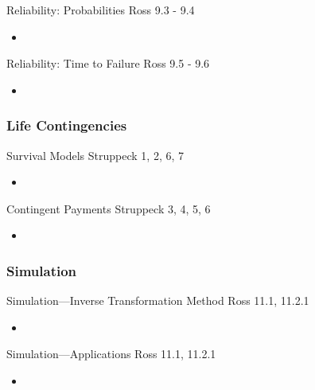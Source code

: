 \documentclass[12pt, titlepage, french]{report}
\begin{document}
\begin{CHPT_SUMM_AUTO_NUMB}[label = {L.-18}]{Reliability: Probabilities}
Ross 9.3 - 9.4
	\begin{itemize}
		\item	
	\end{itemize}
\end{CHPT_SUMM_AUTO_NUMB}

\begin{CHPT_SUMM_AUTO_NUMB}[label = {L.-19}]{Reliability: Time to Failure}
Ross 9.5 - 9.6
	\begin{itemize}
		\item	
	\end{itemize}
\end{CHPT_SUMM_AUTO_NUMB}

\subsubsection*{Life Contingencies}

\begin{CHPT_SUMM_AUTO_NUMB}[label = {L.-20}]{Survival Models}
Struppeck 1, 2, 6, 7
	\begin{itemize}
		\item	
	\end{itemize}
\end{CHPT_SUMM_AUTO_NUMB}

\begin{CHPT_SUMM_AUTO_NUMB}[label = {L.-21}]{Contingent Payments}
Struppeck 3, 4, 5, 6
	\begin{itemize}
		\item	
	\end{itemize}
\end{CHPT_SUMM_AUTO_NUMB}

\subsubsection*{Simulation}

\begin{CHPT_SUMM_AUTO_NUMB}[label = {L.-22}]{Simulation---Inverse Transformation Method}
Ross 11.1, 11.2.1
	\begin{itemize}
		\item	
	\end{itemize}
\end{CHPT_SUMM_AUTO_NUMB}

\begin{CHPT_SUMM_AUTO_NUMB}[label = {L.-23}]{Simulation---Applications}
Ross 11.1, 11.2.1
	\begin{itemize}
		\item	
	\end{itemize}
\end{CHPT_SUMM_AUTO_NUMB}
\end{document}
